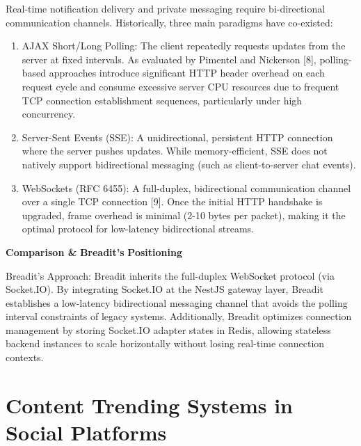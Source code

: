 Real-time notification delivery and private messaging require bi-directional communication channels. Historically, three main paradigms have co-existed:
\begin{enumerate}
  \item AJAX Short/Long Polling: The client repeatedly requests updates from the server at fixed intervals. As evaluated by Pimentel and Nickerson [8], polling-based approaches introduce significant HTTP header overhead on each request cycle and consume excessive server CPU resources due to frequent TCP connection establishment sequences, particularly under high concurrency.
  \item Server-Sent Events (SSE): A unidirectional, persistent HTTP connection where the server pushes updates. While memory-efficient, SSE does not natively support bidirectional messaging (such as client-to-server chat events).
  \item WebSockets (RFC 6455): A full-duplex, bidirectional communication channel over a single TCP connection [9]. Once the initial HTTP handshake is upgraded, frame overhead is minimal (2-10 bytes per packet), making it the optimal protocol for low-latency bidirectional streams.
\end{enumerate}

\textbf{Comparison \& }\textbf{Breadit's}\textbf{ Positioning}

Breadit's Approach: Breadit inherits the full-duplex WebSocket protocol (via Socket.IO). By integrating Socket.IO at the NestJS gateway layer, Breadit establishes a low-latency bidirectional messaging channel that avoids the polling interval constraints of legacy systems. Additionally, Breadit optimizes connection management by storing Socket.IO adapter states in Redis, allowing stateless backend instances to scale horizontally without losing real-time connection contexts.

\section{Content Trending Systems in Social Platforms}

